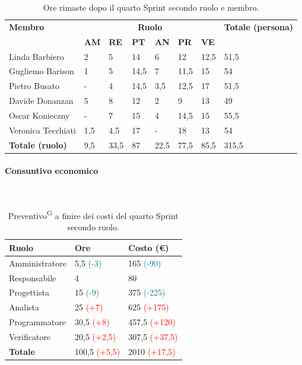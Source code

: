\documentclass[8pt]{article}
\newcommand{\glossterm}[1]{#1\textsuperscript{G}} %
\newcommand{\subsubsubsection}[1]{\paragraph{#1}\mbox{}\\}
\begin{document}
\begin{table}[ht!]
	\centering
	\begin{tabular}{p{4cm} p{1cm} p{1cm} p{1cm} p{1cm} p{1cm} p{1cm} p{3cm}}
		\toprule
        \textbf{Membro} & \multicolumn{6}{c}{\textbf{Ruolo}} & \textbf{Totale (persona)}\\
		& \textbf{AM} & \textbf{RE} & \textbf{PT} & \textbf{AN} & \textbf{PR} & \textbf{VE}\\
		\midrule
        Linda Barbiero     & 2 & 5 & 14 & 6 & 12 & 12,5 & 51,5 \\
        Gugliemo Barison   & 1 & 5 & 14,5 & 7 & 11,5 & 15 & 54 \\
        Pietro Busato      & - & 4 & 14,5 & 3,5 & 12,5 & 17 & 51,5 \\
        Davide Donanzan    & 5 & 8 & 12 & 2 & 9 & 13 & 49 \\
        Oscar Konieczny    & - & 7 & 15 & 4 & 14,5 & 15 & 55,5 \\
        Veronica Tecchiati & 1,5 & 4,5 & 17 & - & 18 & 13 & 54 \\
        \midrule
        \textbf{Totale (ruolo)} & 9,5 & 33,5 & 87 & 22,5 & 77,5 & 85,5 & 315,5 \\
		\bottomrule
	\end{tabular}
	\caption{Ore rimaste dopo il quarto Sprint secondo ruolo e membro.}
	\label{table:Ore rimaste dopo il quarto Sprint secondo ruolo e membro.}
\end{table}
\subsubsubsection{Consuntivo economico}
\begin{table}[ht!]
    \centering
    \begin{tabular}{p{4cm} p{1.8cm} p{2.2cm}}
        \toprule
        \textbf{Ruolo} & \textbf{Ore} & \textbf{Costo (€)} \\
        \midrule
        Amministratore & 5,5 \textcolor{teal}{(-3)} & 165 \textcolor{teal}{(-90)} \\
        Responsabile & 4  & 80 \\
        Progettista & 15 \textcolor{teal}{(-9)}  & 375 \textcolor{teal}{(-225)} \\
        Analista & 25 \textcolor{red}{(+7)} & 625 \textcolor{red}{(+175)} \\
        Programmatore & 30,5 \textcolor{red}{(+8)} & 457,5 \textcolor{red}{(+120)} \\
        Verificatore & 20,5 \textcolor{red}{(+2,5)} & 307,5 \textcolor{red}{(+37,5)} \\
        \midrule
        \textbf{Totale} & 100,5 \textcolor{red}{(+5,5)} & 2010 \textcolor{red}{(+17,5)}
    \end{tabular}
    \caption{\glossterm{Preventivo} a finire dei costi del quarto Sprint secondo ruolo.}
    \label{table:Preventivo a finire dei costi del quartoo Sprint secondo ruolo}
\end{table}
\end{document}
